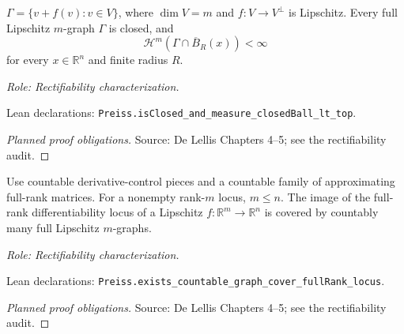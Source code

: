 \begin{lemma}
\label{lem:graph-borel-finite}







\(\Gamma=\{v+f(v):v\in V\}\), where \(\dim V=m\) and \(f:V\to V^\perp\) is Lipschitz.
Every full Lipschitz \(m\)-graph \(\Gamma\) is closed, and
\[
 \mathcal H^m(\Gamma\cap\overline B_R(x))<\infty
\]
for every \(x\in\mathbb R^n\) and finite radius \(R\).
\par\emph{Role: Rectifiability characterization.}
\par Lean declarations: \texttt{Preiss.isClosed\_and\_measure\_closedBall\_lt\_top}.
\end{lemma}
\begin{proof}[Planned proof obligations]

\par Source: De Lellis Chapters 4--5; see the rectifiability audit.
\end{proof}

\begin{lemma}
\label{lem:full-rank-graph-pieces}








Use countable derivative-control pieces and a countable family of approximating full-rank matrices. For a nonempty rank-\(m\) locus, \(m\leq n\).
The image of the full-rank differentiability locus of a Lipschitz \(f:\mathbb R^m\to\mathbb R^n\) is covered by countably many full Lipschitz \(m\)-graphs.
\par\emph{Role: Rectifiability characterization.}
\par Lean declarations: \texttt{Preiss.exists\_countable\_graph\_cover\_fullRank\_locus}.
\end{lemma}
\begin{proof}[Planned proof obligations]

\par Source: De Lellis Chapters 4--5; see the rectifiability audit.
\end{proof}

